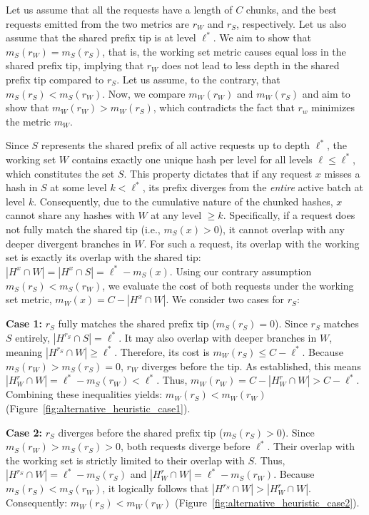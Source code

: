 Let us assume that all the requests have a length of $C$ chunks, and the best requests emitted from the two metrics are $r_W$ and $r_S$, respectively. Let us also assume that the shared prefix tip is at level $\ell^*$. We aim to show that $m_S(r_W) = m_S(r_S)$, that is, the working set metric causes equal loss in the shared prefix tip, implying that $r_W$ does not lead to less depth in the shared prefix tip compared to $r_S$. Let us assume, to the contrary, that $m_S(r_S) < m_S(r_W)$. Now, we compare $m_W(r_W)$ and $m_W(r_S)$ and aim to show that $m_W(r_W) > m_W(r_S)$, which contradicts the fact that $r_w$ minimizes the metric $m_W$.

Since $S$ represents the shared prefix of all active requests up to depth $\ell^*$, the working set $W$ contains exactly one unique hash per level for all levels $\ell \leq \ell^*$, which constitutes the set $S$. This property dictates that if any request $x$ misses a hash in $S$ at some level $k < \ell^*$, its prefix diverges from the \textit{entire} active batch at level $k$. Consequently, due to the cumulative nature of the chunked hashes, $x$ cannot share any hashes with $W$ at any level $\geq k$. Specifically, if a request does not fully match the shared tip (i.e., $m_S(x) > 0$), it cannot overlap with any deeper divergent branches in $W$. For such a request, its overlap with the working set is exactly its overlap with the shared tip: $|H^x \cap W| = |H^x \cap S| = \ell^* - m_S(x)$. Using our contrary assumption $m_S(r_S) < m_S(r_W)$, we evaluate the cost of both requests under the working set metric, $m_W(x) = C - |H^x \cap W|$. We consider two cases for $r_S$: 

\noindent \textbf{Case 1:} $r_S$ fully matches the shared prefix tip ($m_S(r_S) = 0$). Since $r_S$ matches $S$ entirely, $|H^{r_S} \cap S| = \ell^*$. It may also overlap with deeper branches in $W$, meaning $|H^{r_S} \cap W| \geq \ell^*$. Therefore, its cost is $m_W(r_S) \leq C - \ell^*$. Because $m_S(r_W) > m_S(r_S) = 0$, $r_W$ diverges before the tip. As established, this means $|H^r_W \cap W| = \ell^* - m_S(r_W) < \ell^*$. Thus, $m_W(r_W) = C - |H^r_W \cap W| > C - \ell^*$. Combining these inequalities yields: $m_W(r_S) < m_W(r_W)$ (Figure~\ref{fig:alternative_heuristic_case1}).

\noindent \textbf{Case 2:} $r_S$ diverges before the shared prefix tip ($m_S(r_S) > 0$). Since $m_S(r_W) > m_S(r_S) > 0$, both requests diverge before $\ell^*$. Their overlap with the working set is strictly limited to their overlap with $S$. Thus, $|H^{r_S} \cap W| = \ell^* - m_S(r_S)$ and $|H^r_W \cap W| = \ell^* - m_S(r_W)$. Because $m_S(r_S) < m_S(r_W)$, it logically follows that $|H^{r_S} \cap W| > |H^r_W \cap W|$. Consequently: $m_W(r_S) < m_W(r_W)$ (Figure~\ref{fig:alternative_heuristic_case2}).

